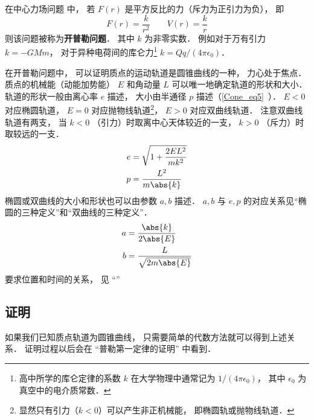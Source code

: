 
在中心力场问题 中， 若 $F(r)$ 是平方反比的力（斥力为正引力为负）， 即
\begin{equation}
F(r) = \frac{k}{r^2}  \qquad V(r) = \frac{k}{r}
\end{equation}
则该问题被称为\textbf{开普勒问题}． 其中 $k$ 为非零实数． 例如对于万有引力 $k = -GMm$， 对于异种电荷间的库仑力\footnote{高中所学的库仑定律的系数 $k$ 在大学物理中通常记为 $1/(4\pi\epsilon_0)$， 其中 $\epsilon_0$ 为真空中的电介质常数．} $k = Qq/(4\pi\epsilon_0)$．

在开普勒问题中， 可以证明质点的运动轨道是圆锥曲线的一种， 力心处于焦点． 质点的机械能（动能加势能） $E$ 和角动量 $L$ 可以唯一地确定轨道的形状和大小． 轨道的形状一般由离心率 $e$ 描述， 大小由半通径 $p$ 描述（\autoref{Cone_eq5}~）． $E < 0$ 对应椭圆轨道， $E = 0$ 对应抛物线轨道\footnote{显然只有引力（$k < 0$）可以产生非正机械能， 即椭圆轨或抛物线轨道．}， $E > 0$ 对应双曲线轨道． 注意双曲线轨道有两支， 当 $k < 0$ （引力）时取离中心天体较近的一支， $k > 0$ （斥力）时取较远的一支．
\begin{align}
e &= \sqrt{1 + \frac{2EL^2}{mk^2}}\label{CelBd_eq2}\\
p &= \frac{L^2}{m\abs{k}}\label{CelBd_eq3}
\end{align}
椭圆或双曲线的大小和形状也可以由参数 $a,b$ 描述． $a,b$ 与 $e,p$ 的对应关系见“椭圆的三种定义”和“双曲线的三种定义”．
\begin{align}
a &= \frac{\abs{k}}{2\abs{E}}\label{CelBd_eq7}\\
b &= \frac{L}{\sqrt{2m\abs{E}}}\label{CelBd_eq8}
\end{align}
要求位置和时间的关系， 见 “”

\subsection{证明}
如果我们已知质点轨道为圆锥曲线， 只需要简单的代数方法就可以得到上述关系． 证明过程以后会在 “普勒第一定律的证明” 中看到．

